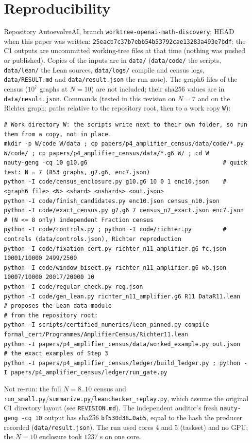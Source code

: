\documentclass[10pt]{article}
\begin{document}
\section{Reproducibility}\label{sec:repro}
Repository AutoevolveAI, branch \texttt{worktree-openai-math-discovery}; HEAD when this paper was written: \texttt{25eacb7c37b7ebb54b53792cae13283a493e7bdf}; the C1 outputs are uncommitted working-tree files at that time (nothing was pushed or published). Copies of the inputs are in \texttt{data/} (\texttt{data/code/} the scripts, \texttt{data/lean/} the Lean sources, \texttt{data/logs/} compile and census logs, \texttt{data/RESULT.md} and \texttt{data/result.json} the run note). The graph6 files of the census ($10^7$ graphs at $N=10$) are not included; their sha256 values are in \texttt{data/result.json}. Commands (tested in this revision on $N=7$ and on the Richter graph; paths relative to the repository root, then to a work copy \texttt{W}):
\begin{lstlisting}[basicstyle=\ttfamily\scriptsize]
# Work directory W: the scripts write next to their own folder, so run them from a copy, not in place.
mkdir -p W/code W/data ; cp papers/p4_amplifier_census/data/code/*.py W/code/ ; cp papers/p4_amplifier_census/data/*.g6 W/ ; cd W
nauty-geng -cq 10 g10.g6                                       # quick test: N = 7 (853 graphs, g7.g6, enc7.json)
python -I code/census_enclosure.py g10.g6 10 0 1 enc10.json    # <graph6 file> <N> <shard> <nshards> <out.json>
python -I code/finish_candidates.py enc10.json census_n10.json
python -I code/exact_census.py g7.g6 7 census_n7_exact.json enc7.json  # (N <= 8 only) independent Fraction census
python -I code/controls.py ; python -I code/richter.py         # controls (data/controls.json), Richter reproduction
python -I code/fixation_cert.py richter_n11_amplifier.g6 fc.json 10001/10000 2499/2500
python -I code/window_bisect.py richter_n11_amplifier.g6 wb.json 10007/10000 20017/20000 10
python -I code/regular_check.py reg.json
python -I code/gen_lean.py richter_n11_amplifier.g6 R11 DataR11.lean   # proposes the Lean data module
# from the repository root:
python -I scripts/certified_numerics/lean_pinned.py compile formal_cert/Programmes/AmplifierCensus/Richter11.lean
python -I papers/p4_amplifier_census/data/worked_example.py out.json   # the exact examples of Step 3
python -I papers/p4_amplifier_census/ledger/build_ledger.py ; python -I papers/p4_amplifier_census/ledger/run_gate.py
\end{lstlisting}
Not re-run: the full $N=8..10$ census and \texttt{run\_small.py}/\texttt{summarize.py}/\texttt{leanchecker\_replay.py}, which assume the original C1 directory layout (see \texttt{REVISION.md}). The independent auditor's fresh \texttt{nauty-geng -cq 10} output has sha256 \texttt{bf530d38\dots0ab5}, equal to the hash the producer recorded (\texttt{data/result.json}). The run used cores 4 and 5 (taskset) and no GPU; the $N=10$ enclosure took $1237$ s on one core.
\end{document}
